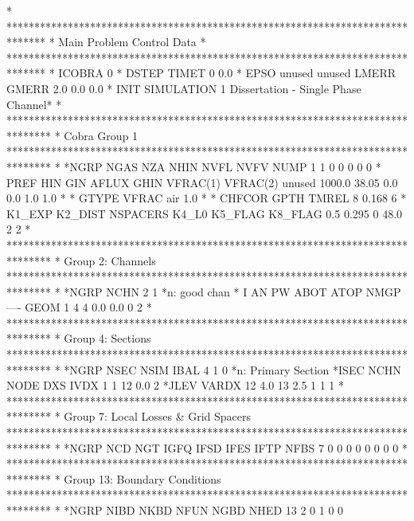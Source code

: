 *
*******************************************************************************
* Main Problem Control Data                                                   *
*******************************************************************************
*       ICOBRA
             0
*        DSTEP         TIMET
             0           0.0
*         EPSO        unused        unused         LMERR         GMERR
           2.0                                       0.0           0.0
*     INIT                                                           SIMULATION
         1                                 Dissertation - Single Phase Channel*
*
********************************************************************************
* Cobra Group 1
********************************************************************************
*
*NGRP NGAS  NZA NHIN NVFL NVFV NUMP 
    1    1    0    0    0    0    0
*     PREF       HIN       GIN     AFLUX      GHIN  VFRAC(1)  VFRAC(2)    unused
    1000.0     38.05                 0.0       0.0       1.0       1.0          
*
*  GTYPE       VFRAC
air              1.0
*
*   CHFCOR      GPTH     TMREL
         8     0.168         6
*       K1_EXP       K2_DIST      NSPACERS         K4_L0       K5_FLAG       K8_FLAG
           0.5         0.295             0          48.0             2             2
*
********************************************************************************
* Group 2: Channels
********************************************************************************
*
*NGRP NCHN
    2    1
*n: good chan
*   I   AN   PW ABOT ATOP NMGP ---- GEOM
    1    4    4  0.0  0.0    0         2
*
********************************************************************************
* Group 4: Sections
********************************************************************************
*
*NGRP NSEC NSIM IBAL
    4    1    0     
*n: Primary Section
*ISEC NCHN NODE       DXS IVDX
    1    1   12       0.0    2
*JLEV     VARDX 
   12       4.0   13       2.5
    1    1                             1                         
*
********************************************************************************
* Group 7: Local Losses & Grid Spacers
********************************************************************************
*
*NGRP  NCD  NGT IGFQ IFSD IFES IFTP      NFBS
    7    0    0    0    0    0    0    0    0
*
********************************************************************************
* Group 13: Boundary Conditions
********************************************************************************
*
*NGRP NIBD NKBD NFUN NGBD NHED     
   13    2    0    1    0    0
